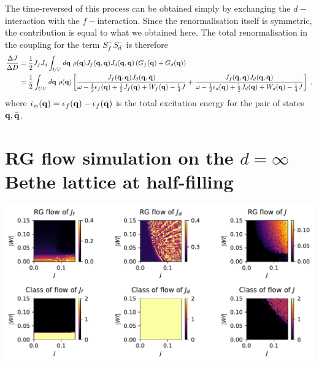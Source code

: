 \documentclass[%
reprint,
superscriptaddress,
groupedaddress,
superscriptaddress,
onecolumn,
10pt
]{revtex4-2}
\begin{document}
The time-reversed of this process can be obtained simply by exchanging the \(d-\)interaction with the \(f-\)interaction. Since the renormalisation itself is symmetric, the contribution is equal to what we obtained here. The total renormalisation in the coupling for the term \(S_f^+ S_d^-\) is therefore
\begin{equation}\begin{aligned}
	\frac{\Delta J}{\Delta D} &= \frac{1}{2}J_f J_d \int_{UV} d{\bf q} ~\rho({\bf q}) J_f(\bar{\bf q},{\bf q}) J_d({\bf q},\bar{\bf q})\left(G_f({\bf q}) + G_d({\bf q})\right) \\
							  &= \frac{1}{2}\int_{UV} d{\bf q} ~\rho({\bf q}) \left[\frac{J_f(\bar{\bf q},{\bf q}) J_d({\bf q},\bar{\bf q})}{\omega - \frac{1}{2}\bar\epsilon_f({\bf q}) + \frac{1}{2}J_f({\bf q}) + W_f({\bf q}) - \frac{1}{4}J} + \frac{J_f(\bar{\bf q},{\bf q}) J_d({\bf q},\bar{\bf q})}{\omega - \frac{1}{2}\bar\epsilon_d({\bf q}) + \frac{1}{2}J_d({\bf q}) + W_d({\bf q}) - \frac{1}{4}J}\right]~,
\end{aligned}\end{equation}
where \(\bar\epsilon_\alpha({\bf q}) = \epsilon_f({\bf q}) - \epsilon_f(\bar{\bf q})\) is the total excitation energy for the pair of states \({\bf q},\bar{\bf q}\).

\section{RG flow simulation on the \(d=\infty\) Bethe lattice at half-filling}
\includegraphics[width=\textwidth]{bilayerHubbard.pdf}
\end{document}
